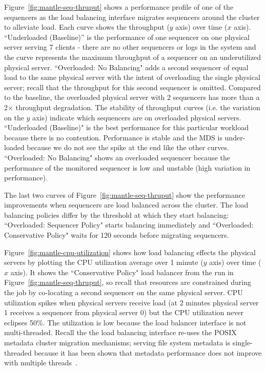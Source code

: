 \documentclass[preprint]{sigplanconf-eurosys}
\begin{document}
Figure~\ref{fig:mantle-seq-thruput} shows a performance profile of one of the
sequencers as the load balancing interface migrates sequencers around the
cluster to alleviate load.  Each curve shows the throughput (\(y\) axis) over
time (\(x\) axis).  ``Underloaded (Baseline)'' is the performance of one sequencer
on one physical server serving 7 clients - there are no other sequencers or
logs in the system and the curve represents the maximum throughput of a
sequencer on an underutilized physical server.  ``Overloaded: No Balancing" adds a
second sequencer of equal load to the same physical server with the intent of
overloading the single physical server; recall that the throughput for this
second sequencer is omitted. Compared to the baseline, the overloaded physical
server with 2 sequencers has more than a 2\(\times\) throughput degradation.
The stability of throughput curves (i.e. the variation on the \(y\) axis) indicate which sequencers
are on overloaded physical servers.  ``Underloaded (Baseline)" is the best
performance for this particular workload because there is no contention.
Performance is stable and the MDS is under-loaded because we do not see the
spike at the end like the other curves.  ``Overloaded: No Balancing" shows an
overloaded sequencer because the performance of the monitored sequencer is low
and unstable (high variation in performance). 

The last two curves of Figure~\ref{fig:mantle-seq-thruput} show the performance
improvements when sequencers are load balanced across the cluster.
The load balancing policies differ by the threshold at which they start balancing:
``Overloaded: Sequencer Policy" starts balancing immediately and ``Overloaded: Conservative
Policy" waits for 120 seconds before migrating sequencers.


Figure~\ref{fig:mantle-cpu-utilization} shows how load balancing effects the
physical servers by plotting the CPU utilization average over 1 minute (\(y\)
axis) over time (\(x\) axis).  It shows the ``Conservative Policy" load
balancer from the run in Figure~\ref{fig:mantle-seq-thruput}, so recall that
resources are constrained during the job by co-locating a second sequencer on
the same physical server.  CPU utilization spikes when physical servers receive
load (at 2 minutes physical server 1 receives a sequencer from physical server
0) but the CPU utilization never eclipses 50\%. The utilization is low because
the load balancer interface is not multi-threaded.  Recall the the load
balancing interface re-uses the POSIX metadata cluster migration mechanisms;
serving file system metadata is single-threaded because it has been shown that
metadata performance does not improve with multiple
threads~\cite{konstantinos:pdsw2014-lustre-metadata}. 
\end{document}
